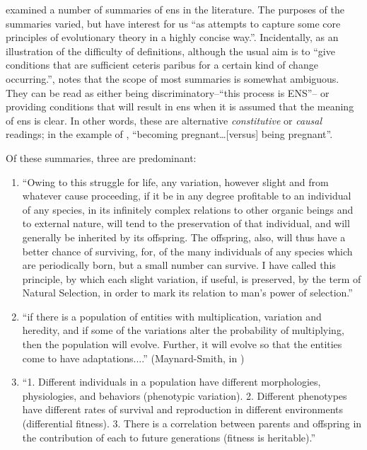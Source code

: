\cite{Godfrey-Smith2007} examined a number of summaries of \gls{ens} in the literature. The purposes of the summaries varied, but have interest for us ``as attempts to capture some core principles of evolutionary theory in a highly concise way.''. Incidentally, as an illustration of the difficulty of definitions, although the usual aim is to ``give conditions that are sufficient ceteris paribus for a certain kind of change occurring.'', \cite{Godfrey-Smith2007} notes that the scope of most summaries is somewhat ambiguous. They can be read as either being discriminatory--``this process is ENS''-- or providing conditions that will result in \gls{ens} when it is assumed that the meaning of \gls{ens} is clear. In other words, these are alternative \emph{constitutive} or \emph{causal} readings; in the example of \cite{Godfrey-Smith2007}, ``becoming pregnant\ldots{}{[}versus{]} being pregnant''.

Of these summaries, three are predominant:

\begin{enumerate}
\item
``Owing to this struggle for life, any variation, however slight and from whatever cause proceeding, if it be in any degree profitable to an individual of any species, in its infinitely complex relations to other organic beings and to external nature, will tend to the preservation of that individual, and will generally be inherited by its offspring. The offspring, also, will thus have a better chance of surviving, for, of the many individuals of any species which are periodically born, but a small number can survive. I have called this principle, by which each slight variation, if useful, is preserved, by the term of Natural Selection, in order to mark its relation to man's power of selection.'' \cite{Darwin1859}

\item
``if there is a population of entities with multiplication, variation and heredity, and if some of the variations alter the probability of multiplying, then the population will evolve. Further, it will evolve so that the entities come to have adaptations....'' (Maynard-Smith, in \cite{Griesemer2001})

\item
``1. Different individuals in a population have different morphologies, physiologies, and behaviors (phenotypic variation). 2. Different phenotypes have different rates of survival and reproduction
in different environments (differential fitness). 3. There is a correlation between parents and offspring in the contribution of each to future generations (fitness is heritable).'' \cite{Lewontin:1970mc}

\end{enumerate}


